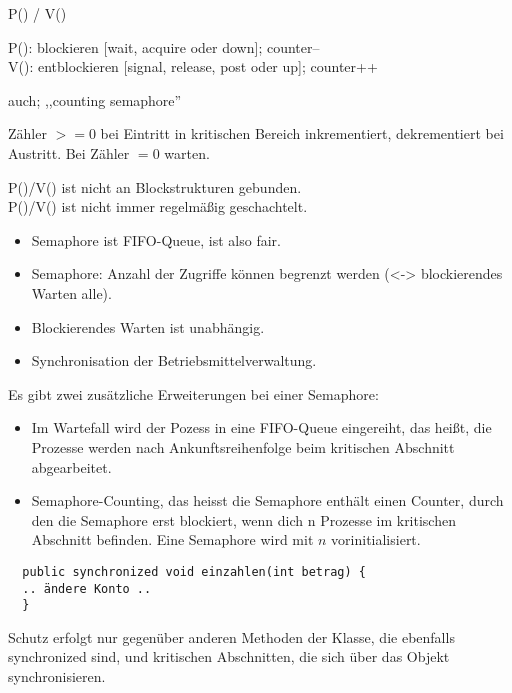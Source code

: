 \begin{answer}
P() / V()

P(): blockieren [wait, acquire oder down]; counter-- \\
V(): entblockieren [signal, release, post oder up]; counter++

auch; ,,counting semaphore''

Zähler $>= 0$ bei Eintritt in kritischen Bereich inkrementiert, dekrementiert bei Austritt. Bei Zähler $= 0$ warten.

P()/V() ist nicht an Blockstrukturen gebunden. \\
P()/V() ist nicht immer regelmäßig geschachtelt.
\end{answer}

\begin{answer}
\begin{itemize}

  \item Semaphore ist FIFO-Queue, ist also fair.

  \item Semaphore: Anzahl der Zugriffe können begrenzt werden (<-> blockierendes Warten alle).

  \item Blockierendes Warten ist unabhängig.

  \item Synchronisation der Betriebsmittelverwaltung.
\end{itemize}

Es gibt zwei zusätzliche Erweiterungen bei einer Semaphore:

\begin{itemize}

  \item Im Wartefall wird der Pozess in eine FIFO-Queue eingereiht, das heißt, die Prozesse werden nach Ankunftsreihenfolge beim kritischen Abschnitt abgearbeitet.

  \item Semaphore-Counting, das heisst die Semaphore enthält einen Counter, durch den die Semaphore erst blockiert, wenn dich n Prozesse im kritischen Abschnitt befinden. Eine Semaphore wird mit $n$ vorinitialisiert.

\end{itemize}
\end{answer}

\begin{answer}
\begin{verbatim}
  public synchronized void einzahlen(int betrag) {
  .. ändere Konto ..
  }
\end{verbatim}

Schutz erfolgt nur gegenüber anderen Methoden der Klasse, die ebenfalls synchronized sind, und kritischen Abschnitten, die sich über das Objekt synchronisieren.
\end{answer}

